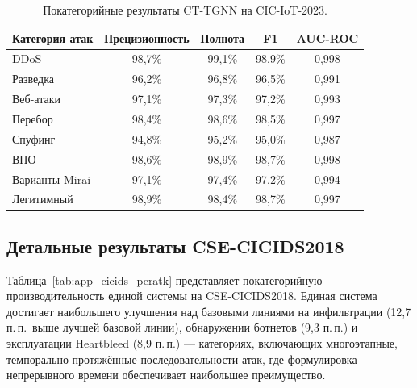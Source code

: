 \begin{table}[htbp]
\centering
\caption{Покатегорийные результаты CT-TGNN на CIC-IoT-2023.}
\label{tab:app_iot_peratk}
\begin{tabular}{lcccc}
\toprule
Категория атак & Прецизионность & Полнота & F1 & AUC-ROC \\
\midrule
DDoS             & 98,7\% & 99,1\% & 98,9\% & 0,998 \\
Разведка         & 96,2\% & 96,8\% & 96,5\% & 0,991 \\
Веб-атаки        & 97,1\% & 97,3\% & 97,2\% & 0,993 \\
Перебор           & 98,4\% & 98,6\% & 98,5\% & 0,997 \\
Спуфинг          & 94,8\% & 95,2\% & 95,0\% & 0,987 \\
ВПО              & 98,6\% & 98,9\% & 98,7\% & 0,998 \\
Варианты Mirai   & 97,1\% & 97,4\% & 97,2\% & 0,994 \\
\midrule
Легитимный       & 98,9\% & 98,4\% & 98,7\% & 0,997 \\
\bottomrule
\end{tabular}
\end{table}


\subsection{Детальные результаты CSE-CICIDS2018}
\label{app:cicids2018_detail}

Таблица~\ref{tab:app_cicids_peratk} представляет покатегорийную производительность единой системы на CSE-CICIDS2018. Единая система достигает наибольшего улучшения над базовыми линиями на инфильтрации (12,7 п.\,п.\ выше лучшей базовой линии), обнаружении ботнетов (9,3 п.\,п.) и эксплуатации Heartbleed (8,9 п.\,п.) --- категориях, включающих многоэтапные, темпорально протяжённые последовательности атак, где формулировка непрерывного времени обеспечивает наибольшее преимущество.

